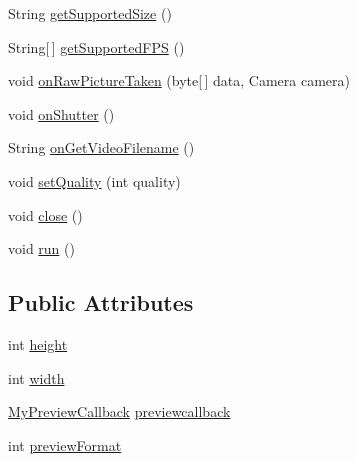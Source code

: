 \begin{DoxyCompactItemize}
String \hyperlink{classswp_1_1tuilmenau_1_1carduinodroid_1_1controller_1_1_cam_aaea0b22ca98286ebc752799baf919457}{get\+Supported\+Size} ()
\item 
String\mbox{[}$\,$\mbox{]} \hyperlink{classswp_1_1tuilmenau_1_1carduinodroid_1_1controller_1_1_cam_ab293c9b431dc51ea0e16584720375473}{get\+Supported\+F\+P\+S} ()
\item 
void \hyperlink{classswp_1_1tuilmenau_1_1carduinodroid_1_1controller_1_1_cam_a356797b49cf972aa95148c88702cf81a}{on\+Raw\+Picture\+Taken} (byte\mbox{[}$\,$\mbox{]} data, Camera camera)
\item 
void \hyperlink{classswp_1_1tuilmenau_1_1carduinodroid_1_1controller_1_1_cam_aef536a7a7774a554aff67f70c5edd1de}{on\+Shutter} ()
\item 
String \hyperlink{classswp_1_1tuilmenau_1_1carduinodroid_1_1controller_1_1_cam_a75b628ee85543bcf0a65cacdaa740430}{on\+Get\+Video\+Filename} ()
\item 
void \hyperlink{classswp_1_1tuilmenau_1_1carduinodroid_1_1controller_1_1_cam_a06e60590e27bce234a6a7f1657f18fc0}{set\+Quality} (int quality)
\item 
void \hyperlink{classswp_1_1tuilmenau_1_1carduinodroid_1_1controller_1_1_cam_a690bbb9c9a4a7555c3e439f5b4e1399e}{close} ()
\item 
void \hyperlink{classswp_1_1tuilmenau_1_1carduinodroid_1_1controller_1_1_cam_ab8d692383962618c356c0d52327a348f}{run} ()
\end{DoxyCompactItemize}
\subsection*{Public Attributes}
\begin{DoxyCompactItemize}
\item 
int \hyperlink{classswp_1_1tuilmenau_1_1carduinodroid_1_1controller_1_1_cam_afbdbc0ff324563f628c5f90f181aa738}{height}
\item 
int \hyperlink{classswp_1_1tuilmenau_1_1carduinodroid_1_1controller_1_1_cam_ac546b52ac9a2eb30e64c9ddd28872cdc}{width}
\item 
\hyperlink{classswp_1_1tuilmenau_1_1carduinodroid_1_1controller_1_1_my_preview_callback}{My\+Preview\+Callback} \hyperlink{classswp_1_1tuilmenau_1_1carduinodroid_1_1controller_1_1_cam_abcf8e504ac5062bb476d248babaa5407}{previewcallback}
\item 
int \hyperlink{classswp_1_1tuilmenau_1_1carduinodroid_1_1controller_1_1_cam_a3ef6ca3a108f8e7e2a4e1a0824bf8dc4}{preview\+Format}
\end{DoxyCompactItemize}


